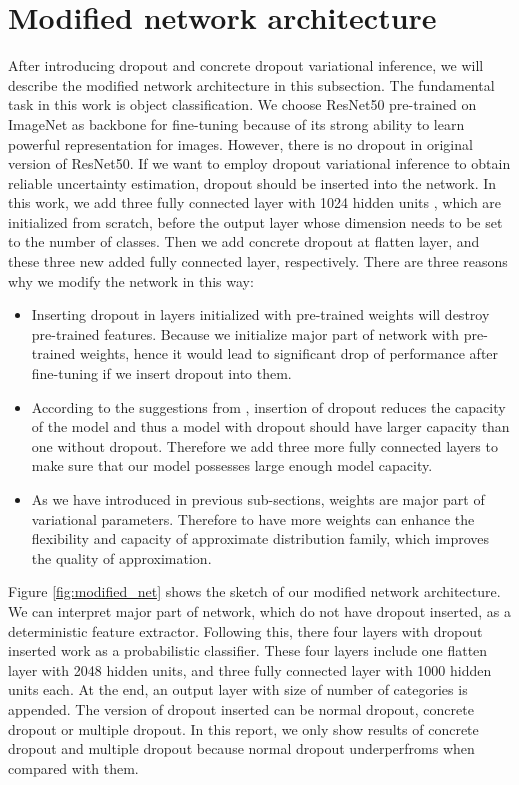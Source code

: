 \section{Modified network architecture}
After introducing dropout and concrete dropout variational inference, we will describe the modified network architecture in this subsection. The fundamental task in this work is object classification. We choose ResNet50\cite{he2016deep} pre-trained on ImageNet as backbone for fine-tuning because of its strong ability to learn powerful representation for images. However, there is no dropout in original version of ResNet50. If we want to employ dropout variational inference to obtain reliable uncertainty estimation, dropout should be inserted into the network. In this work, we add three fully connected layer with 1024 hidden units , which are initialized from scratch, before the output layer whose dimension needs to be set to the number of classes. Then we add concrete dropout at flatten layer, and these three new added fully connected layer, respectively.
There are three reasons why we modify the network in this way:
\begin{itemize}
	\item Inserting dropout in layers initialized with pre-trained weights will destroy pre-trained features. Because we initialize major part of network with pre-trained weights, hence it would lead to significant drop of performance after fine-tuning if we insert dropout into them. 
	\item According to the suggestions from \cite{srivastava2014dropout}, insertion of dropout reduces the capacity of the model and thus a model with	dropout should have larger capacity than one without dropout. Therefore we add three more fully connected layers to make sure that our model possesses large enough model capacity.
	\item As we have introduced in previous sub-sections, weights are major part of variational parameters. Therefore to have more weights can enhance the flexibility and capacity of approximate distribution family, which improves the quality of approximation.  
\end{itemize}

Figure \ref{fig:modified_net} shows the sketch of our modified network architecture. We can interpret major part of network, which do not have dropout inserted, as a deterministic feature extractor. Following this, there four layers with dropout inserted work as a probabilistic classifier. These four layers include one flatten layer with 2048 hidden units, and three fully connected layer with 1000 hidden units each. At the end, an output layer with size of number of categories is appended. The version of dropout inserted can be normal dropout, concrete dropout or multiple dropout. In this report, we only show results of concrete dropout and multiple dropout because normal dropout underperfroms when compared with them.   

